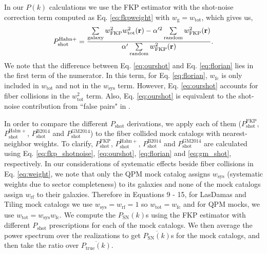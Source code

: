 \documentclass{emulateapj}
\begin{document}
In our $P(k)$ calculations we use the FKP estimator with the shot-noise correction term computed as Eq. \ref{eq:fkpweight} with $w_\mathrm{g} = w_\mathrm{tot}$, which gives us, 
\begin{equation} \label{eq:ourshot}
P^\mathrm{Hahn+}_\mathrm{shot} = \frac{\sum\limits_{\mathrm{galaxy}} w^2_\mathrm{FKP}w^2_\mathrm{tot}({\bf r}) - \alpha'^2 \sum\limits_{\mathrm{random}} w_\mathrm{FKP}^2({\bf r})}{\alpha' \sum\limits_{\mathrm{random}}w_\mathrm{FKP}^2({\bf r})}.
\end{equation}
We note that the difference between Eq. \ref{eq:ourshot} and Eq. \ref{eq:florian} lies in the first term of the numerator. In this term, for Eq. \ref{eq:florian}, $w_\mathrm{fc}$ is only included in $w_\mathrm{tot}$ and not in the $w_\mathrm{sys}$ term. However, Eq. \ref{eq:ourshot} accounts for fiber collisions in the $w_\mathrm{tot}^2$ term. Also, Eq. \ref{eq:ourshot} is equivalent to the shot-noise contribution from ``false pairs" in \cite{Gil-Marin:2014aa}. 


In order to compare the different $P_\mathrm{shot}$ derivations, we apply each of them ($P^\mathrm{FKP}_\mathrm{shot}$, $P^\mathrm{Hahn+}_\mathrm{shot}$, $P^\mathrm{B2014}_\mathrm{shot}$ and $P^\mathrm{GM2014}_\mathrm{shot}$) to the fiber collided mock catalogs with nearest-neighbor weights. To clarify, $P^\mathrm{FKP}_\mathrm{shot}$, $P^\mathrm{Hahn+}_\mathrm{shot}$, $P^\mathrm{B2014}_\mathrm{shot}$ and $P^\mathrm{GM2014}_\mathrm{shot}$ are calculated using Eq. \ref{eq:fkp_shotnoise}, \ref{eq:ourshot}, \ref{eq:florian} and \ref{eq:gm_shot}, respectively. In our considerations of systematic effects beside fiber collisions in Eq. \ref{eq:weight}, we note that only the QPM mock catalog assigns $w_\mathrm{sys}$ (systematic weights due to sector completeness) to its galaxies and none of the mock catalogs assign $w_\mathrm{rf}$ to their galaxies. Therefore in Equations 9 - 15, for LasDamas and Tiling mock catalogs we use $w_\mathrm{sys} = w_\mathrm{rf} = 1$ so $w_\mathrm{tot} = w_\mathrm{fc}$ and for QPM mocks, we use $w_\mathrm{tot} = w_\mathrm{sys} w_\mathrm{fc}$. We compute the $P_\mathrm{SN}(k)$s using the FKP estimator with different $P_\mathrm{shot}$ prescriptions for each of the mock catalogs. We then average the power spectrum over the realizations to get $\overline{P_\mathrm{SN}(k)}$s for the mock catalogs, and then take the ratio over $\overline{P_\mathrm{true}(k)}$. 
\end{document}
